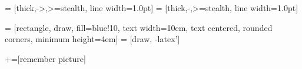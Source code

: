 \usepackage{tikz}
\usetikzlibrary{arrows,shapes}
 = [thick,->,>=stealth, line width=1.0pt]
 = [thick,-,>=stealth, line width=1.0pt]

 = [rectangle, draw, fill=blue!10,
text width=10em, text centered, rounded corners, minimum height=4em]
 = [draw, -latex']

+=[remember picture]
\everymath{\displaystyle}



\newcommand\blfootnote[1]{%
  \begingroup
  \renewcommand\thefootnote{}\footnote{#1}%
  \addtocounter{footnote}{-1}%
  \endgroup
}

\newcommand{\Htar}{H^*}
\newcommand{\ourpaper}{[Li, Han, E \& L, 2020]}


\newcommand{\refhl}[1]{{\color{nusblue}{#1}}}
\newcommand{\todo}[1]{{\color{orange}{[TODO: #1]}}}


\newcommand{\Conv}{\mathop{\scalebox{1.7}{\raisebox{-0.2ex}{$\ast$}}}}%
\newcommand{\set}[1]{\left\lbrace #1 \right\rbrace}

\newcommand\blankpage{%
    \null
    \thispagestyle{empty}%
    \addtocounter{page}{-1}%
    \newpage}

\newcommand{\hcnn}{{{\mathcal H}}_{\text{CNN}}}
\newcommand{\hcnnl}{{\mathcal H}_{\text{CNN}}^{\text{$l$}}}
\newcommand{\hrnn}{\mathcal H_{\text{RNN}}}
\newcommand{\henc}{\mathcal H_{\text{EncDec}}}
\newcommand{\cs}{\mathcal C}
\newcommand\figref{Figure~\ref}
\newcommand{\tensor}[1]{\bm{\mathcal {#1}}}
\newcommand{\tens}[1]{%
  \mathbin{\mathop{\otimes}\limits_{#1}}%
}

\newcommand{\rad}[1]{r(#1)}
\newcommand{\depen}[1]{^{(#1)}}
\newcommand{\bhh}{\bm {\hat H}}
\newcommand{\rh}{\bm \rho\depen{\bm H}}
\newcommand{\rhn}{\rho\depen{\bm H}}
\newcommand{\rhh}{\bm \rho\depen{\bhh}}
\newcommand{\ten}[1]{T_{l^K}(#1)}

